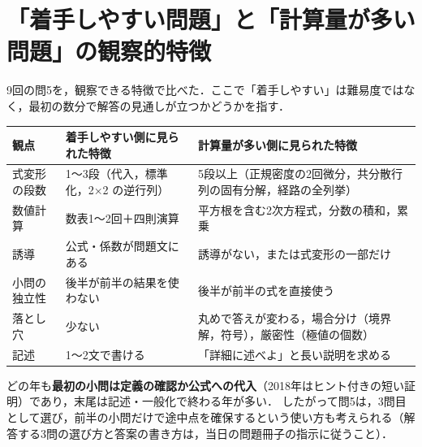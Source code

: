 \section{「着手しやすい問題」と「計算量が多い問題」の観察的特徴}\label{sec:G-features}
9回の問5を，観察できる特徴で比べた．ここで「着手しやすい」は難易度ではなく，最初の数分で解答の見通しが立つかどうかを指す．
\begin{center}\small
\begin{tabular}{@{}L{25mm}L{55mm}L{58mm}@{}}
\toprule
観点 & 着手しやすい側に見られた特徴 & 計算量が多い側に見られた特徴\\
\midrule
式変形の段数 & 1〜3段（代入，標準化，2×2 の逆行列） & 5段以上（正規密度の2回微分，共分散行列の固有分解，経路の全列挙）\\
数値計算 & 数表1〜2回＋四則演算 & 平方根を含む2次方程式，分数の積和，累乗\\
誘導 & 公式・係数が問題文にある & 誘導がない，または式変形の一部だけ\\
小問の独立性 & 後半が前半の結果を使わない & 後半が前半の式を直接使う\\
落とし穴 & 少ない & 丸めで答えが変わる，場合分け（境界解，符号），厳密性（極値の個数）\\
記述 & 1〜2文で書ける & 「詳細に述べよ」と長い説明を求める\\
\bottomrule
\end{tabular}
\end{center}
どの年も\textbf{最初の小問は定義の確認か公式への代入}（2018年はヒント付きの短い証明）であり，末尾は記述・一般化で終わる年が多い．
したがって問5は，3問目として選び，前半の小問だけで途中点を確保するという使い方も考えられる（解答する3問の選び方と答案の書き方は，当日の問題冊子の指示に従うこと）．


